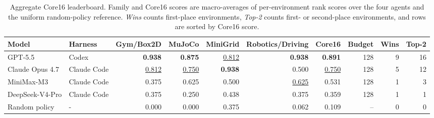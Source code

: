 \begin{table}[t]
\caption{Aggregate Core16 leaderboard. Family and Core16 scores are macro-averages of per-environment rank scores over the four agents and the uniform random-policy reference. \emph{Wins} counts first-place environments, \emph{Top-2} counts first- or second-place environments, and rows are sorted by Core16 score.}
\label{tab:aggregate}
\begin{center}
\scriptsize
\setlength{\tabcolsep}{3.5pt}
\begin{tabular}{llrrrrrrrr}
\toprule
Model & Harness & Gym/Box2D & MuJoCo & MiniGrid & Robotics/Driving
& Core16 & Budget & Wins & Top-2 \\
\midrule
GPT-5.5 & Codex & \textbf{0.938} & \textbf{0.875} & \underline{0.812} & \textbf{0.938} & \textbf{0.891} & 128 & 9 & 16 \\
Claude Opus 4.7 & Claude Code & \underline{0.812} & \underline{0.750} & \textbf{0.938} & 0.500 & \underline{0.750} & 128 & 5 & 12 \\
MiniMax-M3 & Claude Code & 0.375 & 0.625 & 0.500 & \underline{0.625} & 0.531 & 128 & 1 & 3 \\
DeepSeek-V4-Pro & Claude Code & 0.375 & 0.250 & 0.438 & 0.375 & 0.359 & 128 & 1 & 1 \\
Random policy & - & 0.000 & 0.000 & 0.375 & 0.062 & 0.109 & -- & 0 & 0 \\
\bottomrule
\end{tabular}
\end{center}
\end{table}

